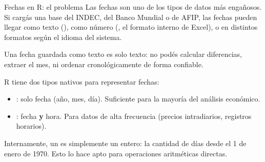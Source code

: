 \documentclass[8pt]{beamer}
\begin{document}
	\begin{frame}[fragile]{Fechas en R: el problema}
		Las fechas son uno de los tipos de datos más engañosos. Si cargás una base del INDEC, del Banco Mundial o de AFIP, las fechas pueden llegar como texto (), como número (, el formato interno de Excel), o en distintos formatos según el idioma del sistema.

		\begin{alertblock}{}
			Una fecha guardada como texto es solo texto: no podés calcular diferencias, extraer el mes, ni ordenar cronológicamente de forma confiable.
		\end{alertblock}

		R tiene dos tipos nativos para representar fechas:
		\begin{itemize}
			\item {}: solo fecha (año, mes, día). Suficiente para la mayoría del análisis económico.
			\item {}: fecha \textbf{y} hora. Para datos de alta frecuencia (precios intradiarios, registros horarios).
		\end{itemize}

		Internamente, un  es simplemente un entero: la cantidad de días desde el 1 de enero de 1970. Esto lo hace apto para operaciones aritméticas directas.
	\end{frame}
\end{document}
